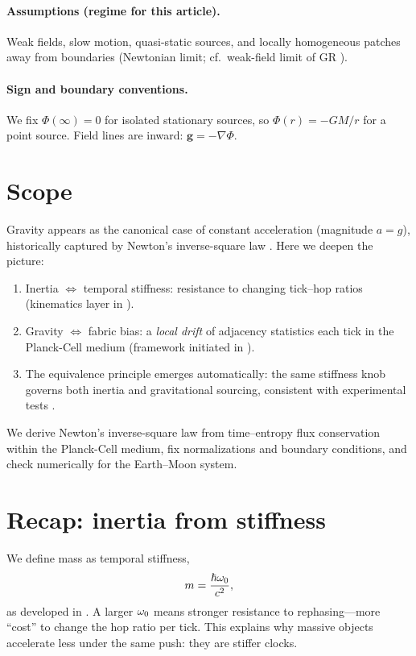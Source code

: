 \documentclass[11pt,oneside]{article}
\begin{document}
\paragraph{Assumptions (regime for this article).}
Weak fields, slow motion, quasi-static sources, and locally homogeneous patches away from boundaries (Newtonian limit; cf.\ weak-field limit of GR \cite{einstein1916foundation,will2014confrontation}).

\paragraph{Sign and boundary conventions.}
We fix $\Phi(\infty)=0$ for isolated stationary sources, so $\Phi(r)=-GM/r$ for a point source. Field lines are inward: $\mathbf g=-\nabla\Phi$.

\section*{Scope}
Gravity appears as the canonical case of constant acceleration (magnitude $a=g$), historically captured by Newton’s inverse-square law \cite{newton1687principia}. Here we deepen the picture:
\begin{enumerate}
  \item Inertia $\Leftrightarrow$ temporal stiffness: resistance to changing tick--hop ratios (kinematics layer in \cite{langstaff2025_planck_cell_kinematics}).
  \item Gravity $\Leftrightarrow$ fabric bias: a \emph{local drift} of adjacency statistics each tick in the Planck-Cell medium (framework initiated in \cite{langstaff2025_temporal_relativity_entropy_clock}).
  \item The equivalence principle emerges automatically: the same stiffness knob governs both inertia and gravitational sourcing, consistent with experimental tests \cite{will2014confrontation}.
\end{enumerate}
We derive Newton’s inverse-square law from time--entropy flux conservation within the Planck-Cell medium, fix normalizations and boundary conditions, and check numerically for the Earth--Moon system.

\section{Recap: inertia from stiffness}
We define mass as temporal stiffness,
\[
m=\frac{\hbar\omega_0}{c^2},
\]
as developed in \cite{langstaff2025_planck_cell_mass}. A larger $\omega_0$ means stronger resistance to rephasing—more ``cost'' to change the hop ratio per tick. This explains why massive objects accelerate less under the same push: they are stiffer clocks.
\end{document}
